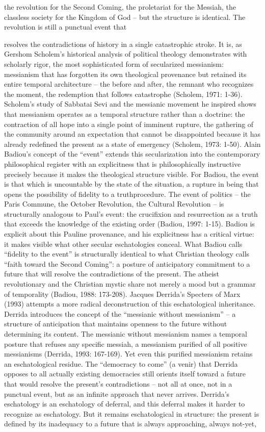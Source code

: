 the revolution for the Second Coming, the proletariat for the Messiah, the classless society for the Kingdom of God – but the structure is identical. The revolution is still a punctual event that

resolves the contradictions of history in a single catastrophic stroke. It is, as Gershom Scholem’s historical analysis of political theology demonstrates with scholarly rigor, the most sophisticated form of secularized messianism: messianism that has forgotten its own theological provenance but retained its entire temporal architecture – the before and after, the remnant who recognizes the moment, the redemption that follows catastrophe (Scholem, 1971: 1-36). Scholem’s study of Sabbatai Sevi and the messianic movement he inspired shows that messianism operates as a temporal structure rather than a doctrine: the contraction of all hope into a single point of imminent rupture, the gathering of the community around an expectation that cannot be disappointed because it has already redefined the present as a state of emergency (Scholem, 1973: 1-50). Alain Badiou’s concept of the “event” extends this secularization into the contemporary philosophical register with an explicitness that is philosophically instructive precisely because it makes the theological structure visible. For Badiou, the event is that which is uncountable by the state of the situation, a rupture in being that opens the possibility of fidelity to a truthprocedure. The event of politics – the Paris Commune, the October Revolution, the Cultural Revolution – is structurally analogous to Paul’s event: the crucifixion and resurrection as a truth that exceeds the knowledge of the existing order (Badiou, 1997: 1-15). Badiou is explicit about this Pauline provenance, and his explicitness has a critical virtue: it makes visible what other secular eschatologies conceal. What Badiou calls “fidelity to the event” is structurally identical to what Christian theology calls “faith toward the Second Coming”: a posture of anticipatory commitment to a future that will resolve the contradictions of the present. The atheist revolutionary and the Christian mystic share not merely a mood but a grammar of temporality (Badiou, 1988: 173-208). Jacques Derrida’s Specters of Marx (1993) attempts a more radical deconstruction of this eschatological inheritance. Derrida introduces the concept of the “messianic without messianism” – a structure of anticipation that maintains openness to the future without determining its content. The messianic without messianism names a temporal posture that refuses any specific messiah, a messianism purified of all positive messianisms (Derrida, 1993: 167-169). Yet even this purified messianism retains an eschatological residue. The “democracy to come” (a venir) that Derrida opposes to all actually existing democracies still orients itself toward a future that would resolve the present’s contradictions – not all at once, not in a punctual event, but as an infinite approach that never arrives. Derrida’s eschatology is an eschatology of deferral, and this deferral makes it harder to recognize as eschatology. But it remains eschatological in structure: the present is defined by its inadequacy to a future that is always approaching, always not-yet, 